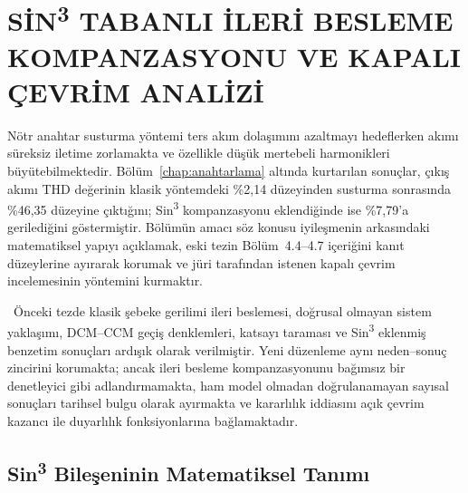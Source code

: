 \chapter{SİN\texorpdfstring{\textsuperscript{3}}{3} TABANLI İLERİ BESLEME KOMPANZASYONU VE KAPALI ÇEVRİM ANALİZİ}
\label{chap:sin3}

Nötr anahtar susturma yöntemi ters akım dolaşımını azaltmayı hedeflerken akımı süreksiz iletime zorlamakta ve özellikle düşük mertebeli harmonikleri büyütebilmektedir. Bölüm~\ref{chap:anahtarlama} altında kurtarılan sonuçlar, çıkış akımı THD değerinin klasik yöntemdeki \%2,14 düzeyinden susturma sonrasında \%46,35 düzeyine çıktığını; Sin\textsuperscript{3} kompanzasyonu eklendiğinde ise \%7,79'a gerilediğini göstermiştir. Bölümün amacı söz konusu iyileşmenin arkasındaki matematiksel yapıyı açıklamak, eski tezin Bölüm~4.4--4.7 içeriğini kanıt düzeylerine ayırarak korumak ve jüri tarafından istenen kapalı çevrim incelemesinin yöntemini kurmaktır.

\eskitezetiketi\ Önceki tezde klasik şebeke gerilimi ileri beslemesi, doğrusal olmayan sistem yaklaşımı, DCM--CCM geçiş denklemleri, katsayı taraması ve Sin\textsuperscript{3} eklenmiş benzetim sonuçları ardışık olarak verilmiştir. Yeni düzenleme aynı neden--sonuç zincirini korumakta; ancak ileri besleme kompanzasyonunu bağımsız bir denetleyici gibi adlandırmamakta, ham model olmadan doğrulanamayan sayısal sonuçları tarihsel bulgu olarak ayırmakta ve kararlılık iddiasını açık çevrim kazancı ile duyarlılık fonksiyonlarına bağlamaktadır.

\section{Sin\texorpdfstring{\textsuperscript{3}}{3} Bileşeninin Matematiksel Tanımı}

